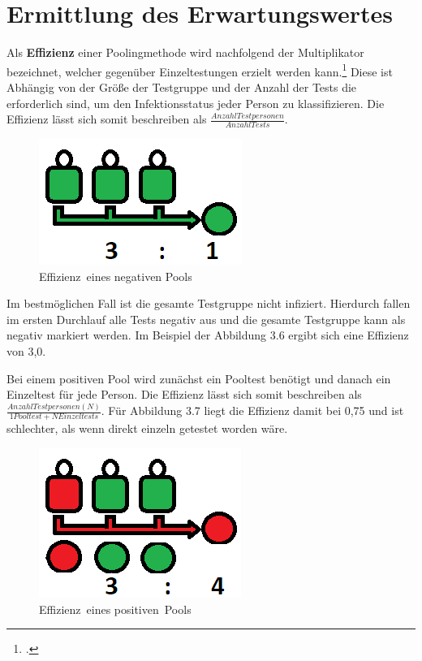 \section{Ermittlung des Erwartungswertes}
Als \textbf{Effizienz} einer Poolingmethode wird nachfolgend der Multiplikator bezeichnet, welcher gegenüber Einzeltestungen erzielt werden kann.\footcite{viehweger_increased_2020}
Diese ist Abhängig von der Größe der Testgruppe und der Anzahl der Tests die erforderlich sind, um den Infektionsstatus jeder Person zu klassifizieren.
Die Effizienz lässt sich somit beschreiben als $\frac{Anzahl Testpersonen}{Anzahl Tests} $.
\begin{figure}[h]
	\centering
	\includegraphics[width=.4\textwidth]{img/EffizienzNegativ}
	\caption{\mbox{Effizienz eines} \mbox{negativen} Pools\footnotemark}
\end{figure}
Im bestmöglichen Fall ist die gesamte Testgruppe nicht infiziert.
Hierdurch fallen im ersten Durchlauf alle Tests negativ aus und die gesamte Testgruppe kann als negativ markiert werden.
Im Beispiel der Abbildung 3.6 ergibt sich eine Effizienz von 3,0.

Bei einem positiven Pool wird zunächst ein Pooltest benötigt und danach ein Einzeltest für jede Person.
Die Effizienz lässt sich somit beschreiben als $\frac{Anzahl Testpersonen (N)}{1 Pooltest + N Einzeltests} $.
Für Abbildung 3.7 liegt die Effizienz damit bei 0,75 und ist schlechter, als wenn direkt einzeln getestet worden wäre.

\begin{figure}[h]
	\centering
	\includegraphics[width=.4\textwidth]{img/EffizienzPositiv}
	\caption{\mbox{Effizienz eines} \mbox{positiven Pools}\footnotemark}
\end{figure}

